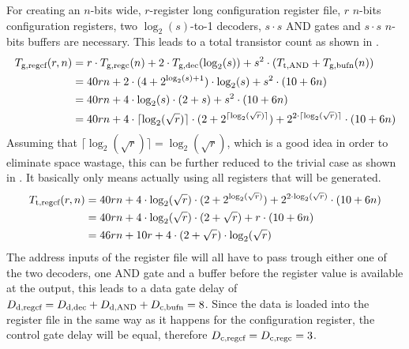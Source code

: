 \documentclass[a4paper, 9pt, conference, onecolumn]{ieeeconf}
\newcommand{\ifnn}[1]{\if\relax\detokenize{#1}\relax\else}
\newcommand{\f}[3]{#1_{\text{\ifnn{#2}#2,\fi#3}}}
\begin{document}
\begin{itemize}
    For creating an $n$-bits wide, $r$-register long configuration register file, $r$ $n$-bits configuration registers, two $\log_{2}(s)$-to-1 decoders, $s \cdot s$ AND gates and $s \cdot s$ $n$-bits buffers are necessary. This leads to a total transistor count as shown in .
    \begin{equation}
      \label{eqn:regcf_tcount_gen}
      \begin{aligned}
        \f{T}{g}{regcf}(r, n) &= r \cdot \f{T}{g}{regc}(n) + 2 \cdot \f{T}{g}{dec}(\log_{2}(s)) + s^{2} \cdot (\f{T}{t}{AND} + \f{T}{g}{bufn}(n)) \\
                              &= 40rn + 2 \cdot (4 + 2^{\log_{2}(s) + 1}) \cdot \log_{2}(s) + s^{2} \cdot (10 + 6n) \\
                              &= 40rn + 4 \cdot \log_{2}(s) \cdot (2 + s) + s^{2} \cdot (10 + 6n) \\
                              &= 40rn + 4 \cdot \lceil\log_{2}(\sqrt{r})\rceil \cdot (2 + 2^{\lceil\log_{2}(\sqrt{r})\rceil}) + 2^{2 \cdot \lceil\log_{2}(\sqrt{r})\rceil} \cdot (10 + 6n) \\
      \end{aligned}
    \end{equation}
    Assuming that $\lceil\log_{2}(\sqrt{r})\rceil = \log_{2}(\sqrt{r})$, which is a good idea in order to eliminate space wastage, this can be further reduced to the trivial case as shown in . It basically only means actually using all registers that will be generated.
    \begin{equation}
      \label{eqn:regcf_tcount_triv}
      \begin{aligned}
        \f{T}{t}{regcf}(r, n) &= 40rn + 4 \cdot \log_{2}(\sqrt{r}) \cdot (2 + 2^{\log_{2}(\sqrt{r})}) + 2^{2 \cdot \log_{2}(\sqrt{r})} \cdot (10 + 6n) \\
                              &= 40rn + 4 \cdot \log_{2}(\sqrt{r}) \cdot (2 + \sqrt{r}) + r \cdot (10 + 6n) \\
                              &= 46rn + 10r + 4 \cdot (2 + \sqrt{r}) \cdot \log_{2}(\sqrt{r}) \\
      \end{aligned}
    \end{equation}
    The address inputs of the register file will all have to pass trough either one of the two decoders, one AND gate and a buffer before the register value is available at the output, this leads to a data gate delay of $\f{D}{d}{regcf} = \f{D}{d}{dec} + \f{D}{d}{AND} + \f{D}{c}{bufn} = 8$. Since the data is loaded into the register file in the same way as it happens for the configuration register, the control gate delay will be equal, therefore $\f{D}{c}{regcf} = \f{D}{c}{regc} = 3$.

\end{itemize}
\end{document}
